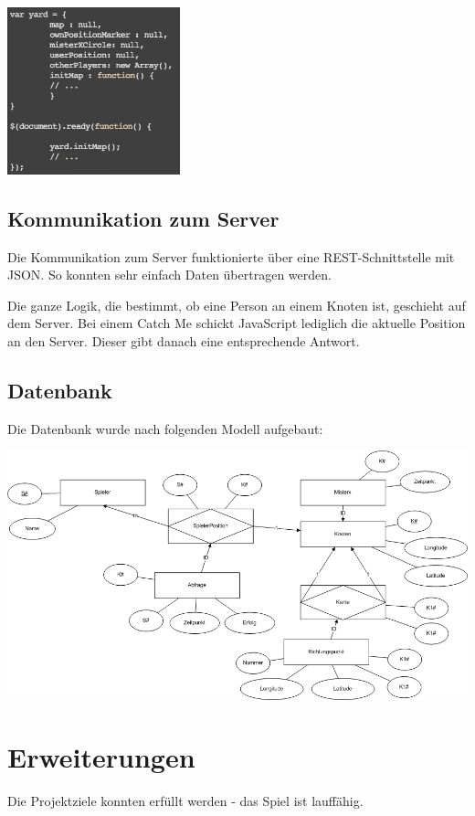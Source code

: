 \documentclass[11pt]{article}
\begin{document}
\includegraphics[width=5cm]{Bilder/AufbauJS.png}

\subsection{Kommunikation zum Server}
Die Kommunikation zum Server funktionierte über eine REST-Schnittstelle mit JSON. So konnten sehr einfach Daten übertragen werden. 

Die ganze Logik, die bestimmt, ob eine Person an einem Knoten ist, geschieht auf dem Server. Bei einem Catch Me schickt JavaScript lediglich die aktuelle Position an den Server. Dieser gibt danach eine entsprechende Antwort.

\subsection{Datenbank}
Die Datenbank wurde nach folgenden Modell aufgebaut:

\includegraphics[width=15cm]{Bilder/ERYard.png}

\section{Erweiterungen}
Die Projektziele konnten erfüllt werden - das Spiel ist lauffähig. 
\end{document}
